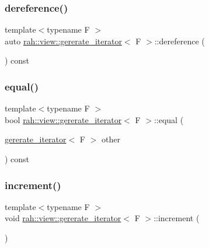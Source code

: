 \subsubsection{\texorpdfstring{dereference()}{dereference()}}
{\footnotesize\ttfamily template$<$typename F $>$ \\
auto \mbox{\hyperlink{structrah_1_1view_1_1gererate__iterator}{rah\+::view\+::gererate\+\_\+iterator}}$<$ F $>$\+::dereference (\begin{DoxyParamCaption}{ }\end{DoxyParamCaption}) const\hspace{0.3cm}{\ttfamily [inline]}}

\mbox{\label{structrah_1_1view_1_1gererate__iterator_ae41007b9e3f9997ac95f011b38a0d5d2}} 
\subsubsection{\texorpdfstring{equal()}{equal()}}
{\footnotesize\ttfamily template$<$typename F $>$ \\
bool \mbox{\hyperlink{structrah_1_1view_1_1gererate__iterator}{rah\+::view\+::gererate\+\_\+iterator}}$<$ F $>$\+::equal (\begin{DoxyParamCaption}\item[{\mbox{\hyperlink{structrah_1_1view_1_1gererate__iterator}{gererate\+\_\+iterator}}$<$ F $>$}]{other }\end{DoxyParamCaption}) const\hspace{0.3cm}{\ttfamily [inline]}}

\mbox{\label{structrah_1_1view_1_1gererate__iterator_a824eb3cf8ec847d7306559bcf7efc2b5}} 
\subsubsection{\texorpdfstring{increment()}{increment()}}
{\footnotesize\ttfamily template$<$typename F $>$ \\
void \mbox{\hyperlink{structrah_1_1view_1_1gererate__iterator}{rah\+::view\+::gererate\+\_\+iterator}}$<$ F $>$\+::increment (\begin{DoxyParamCaption}{ }\end{DoxyParamCaption})\hspace{0.3cm}{\ttfamily [inline]}}



